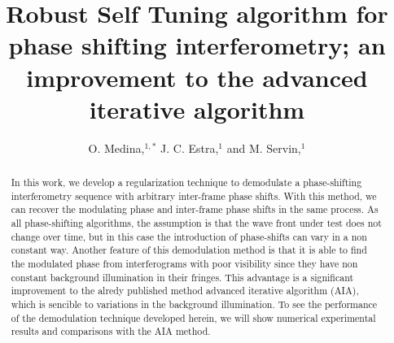 \documentclass[letterpaper,12pt]{article}   %
\begin{document}
\title{Robust Self Tuning algorithm for phase shifting interferometry; an improvement to the advanced iterative algorithm}
\author{O. Medina,$^{1,*}$ J. C. Estra,$^{1}$ and M. Servin,$^{1}$}
\address{$^1$Centro de Investigaciones en \'{O}ptica A. C., Loma del bosque 115, Col. Lomas del Campestre, Le\'{o}n Guanajuato,
37150, M\'{e}xico}
\address{$^*$Corresponding author: orlandomedina@cio.mx}

\maketitle

\begin{abstract}In this work, we develop a regularization technique to demodulate a phase-shifting interferometry sequence with arbitrary inter-frame phase shifts. With this method, we can recover the modulating phase and inter-frame phase shifts in the same process. As all phase-shifting algorithms, the assumption is that the wave front under test does not change over time, but in this case the introduction of phase-shifts can vary in a non constant way. Another feature of this demodulation method is that it is able to find the modulated phase from interferograms with poor visibility since they have non constant background illumination in their fringes. This advantage is a significant improvement to the alredy published method advanced iterative algorithm (AIA), which is sencible to variations in the background illumination. To see the performance of the demodulation technique developed herein, we will show numerical experimental results and comparisons with the AIA method.
\end{abstract}
\end{document}
